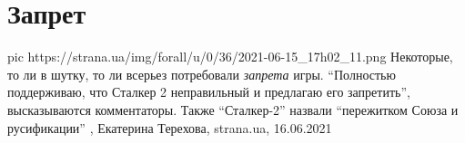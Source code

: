  
 
 
 
 
\chapter{Запрет}
\label{sec:slova.zapret}

\ifcmt
  pic https://strana.ua/img/forall/u/0/36/2021-06-15_17h02_11.png
\fi
Некоторые, то ли в шутку, то ли всерьез потребовали \emph{запрета} игры. 
\enquote{Полностью поддерживаю, что Сталкер 2 неправильный и предлагаю его запретить}, высказываются комментаторы.
Также \enquote{Сталкер-2} назвали \enquote{пережитком Союза и русификации}
, 
Екатерина Терехова, strana.ua, 16.06.2021
